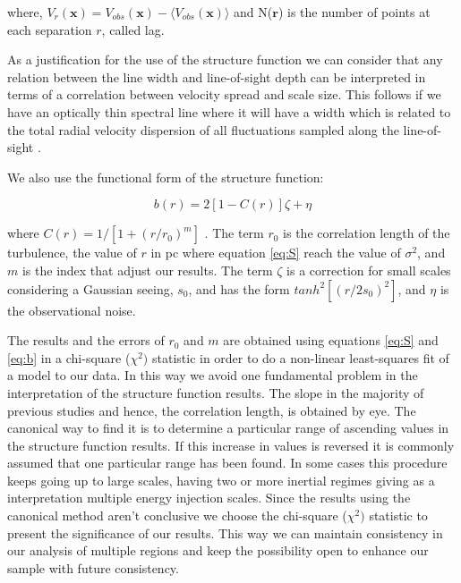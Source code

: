 \documentclass[fleqn,usenatbib, useAMS, a4paper]{mnras}
\begin{document}
where, $V_{r}(\boldsymbol{x})= V_{obs}(\boldsymbol{x})-\langle V_{obs}(\boldsymbol{x}) \rangle$ and N($\boldsymbol{r}$) is the number of points at each separation \(r\), called lag.

As a justification for the use of the structure function we can consider that any relation between the line width and line-of-sight depth can be interpreted in terms of a correlation between velocity spread and scale size.
This follows if we have an optically thin spectral line where it will have a width which is related to the total radial velocity dispersion of all fluctuations sampled along the line-of-sight \citep{1984ApJ...277..556S}.

We also use the functional form of the structure function:

\begin{equation}\label{eq:b}
b(r)=2[1-C(r)]\zeta+\eta
\end{equation}

where $C(r)=1/[1+(r/r_{0})^{m}]$ \citep{1984ApJ...277..556S,arthur2016turbulence}.
The term $r_{0}$ is the correlation length of the turbulence, the value of \(r\) in pc where equation \ref{eq:S} reach the value of \(\sigma^2\), and $m$ is the index that adjust our results.
The term $\zeta$ is a correction for small scales considering a Gaussian seeing, $s_{0}$, and has the form $tanh^{2}[(r/2s_{0})^2]$, and \(\eta\) is the observational noise.

The results and the errors of $r_{0}$ and $m$ are obtained using equations \ref{eq:S} and \ref{eq:b} in a chi-square (\(\chi^2)\) statistic in order to do a non-linear least-squares fit of a model to our data. 
In this way we avoid one fundamental problem in the interpretation of the structure function results. The slope in the majority of previous studies and hence, the correlation length, is obtained by eye. 
The canonical way to find it is to determine a particular range of ascending values in the structure function results. 
If this increase in values is reversed it is commonly assumed that one particular range has been found. 
In some cases this procedure keeps going up to large scales, having two or more inertial regimes giving as a interpretation multiple energy injection scales.
Since the results using the canonical method aren't conclusive we choose the chi-square (\(\chi^2)\) statistic to present the significance of our results.
This way we can maintain consistency in our analysis of multiple regions and keep the possibility open to enhance our sample with future consistency.
\end{document}
